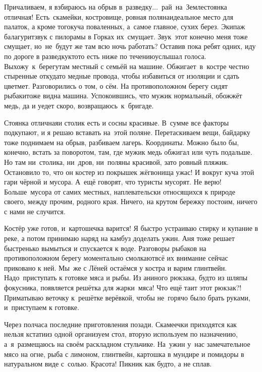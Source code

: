 Причаливаем, я взбираюсь на обрыв в~разведку$\ldots$~рай~на~Земле\mdash стоянка отличная! Есть~скамейки, костровище, ровная поляна\mdash идеальное место для палаток, а кроме того\mdash куча поваленных, а~самое главное, сухих берез. Экипаж балагурит\mdash звук с пилорамы в Горках их~смущает. Звук~этот конечно меня тоже смущает, но~не~будут же там всю ночь работать? Оставив пока ребят одних, иду по дороге в разведку\mdash кто\sdash то есть ниже по течению\mdash услышал голоса. Выхожу~к~берегу\mdash там местный с семьёй на машине. Обжигает~в~костре честно стыренные откуда\sdash то медные провода, чтобы избавиться от изоляции и сдать цветмет. Разговорились о том, о сём. На противоположном берегу сидят рыбаки\mdash тоже видна машина. Успокоившись, что мужик нормальный, обожжёт медь, да и уедет скоро, возвращаюсь~к~бригаде. 

Стоянка отличная\mdash и столик есть и сосны красивые. В~сумме все факторы подкупают, и я решаю вставать на~этой поляне. Перетаскиваем вещи, байдарку тоже поднимаем на обрыв, разбиваем лагерь. Координаты\mdash \CoordsChagodoschaMegrino. Можно было бы, конечно, встать за поворотом, там, где мужик медь обжигал или чуть подальше. Но там ни~столика, ни~дров, ни~поляны красивой, зато ровный пляжик. Остановило то, что он костер из покрышек жёг\mdash вонища ужас! И вокруг куча этой гари чёрной и мусора. А~ещё говорят, что туристы мусорят. Не верю! Больше~мусора от самих местных, наплевательски относящихся к природе своего, между прочим, родного края. Ничего, на крутом бережку постоим, ничего с нами не случится.

\newpage
Костёр уже готов, и~картошечка варится! Я быстро устраиваю стирку и купание в реке, а потом принимаю наряд на камбуз доделать ужин. Аня тоже решает быстренько вымыться и спускается к воде. Разговоры рыбаков на противоположном берегу моментально смолкают\mdash всё их внимание сейчас приковано к ней. Мы~же с Лёней остаёмся у костра и варим глинтвейн. Надо~приступать к готовке мяса и рыбы. Из аниного рюкзака, будто из шляпы фокусника, появляется решётка для жарки~мяса! Что ещё таит этот рюкзак?! Приматываю веточку к~решётке верёвкой, чтобы не~горячо было брать руками, и~приступаем к готовке. 

Через полчаса последние приготовления позади. Скамеечки приходятся как нельзя кстати\mdash из одной организуем стол, вторую используем по назначению, а~я~размещаюсь на своём раскладном стульчике. На~ужин у~нас замечательное мясо на огне, рыба с лимоном, глинтвейн, картошка в мундире и помидоры в натуральном виде с~солью. Красота! Пикник как будто, а не сплав. 

